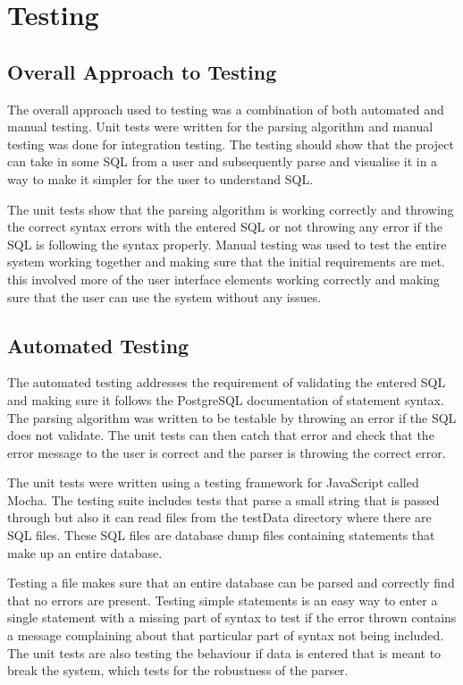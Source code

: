 \chapter{Testing}

\section{Overall Approach to Testing}

The overall approach used to testing was a combination of both automated and manual testing. Unit tests were written for the parsing algorithm and manual testing was done for integration testing. The testing should show that the project can take in some SQL from a user and subsequently parse and visualise it in a way to make it simpler for the user to understand SQL. 

The unit tests show that the parsing algorithm is working correctly and throwing the correct syntax errors with the entered SQL or not throwing any error if the SQL is following the syntax properly. Manual testing was used to test the entire system working together and making sure that the initial requirements are met. this involved more of the user interface elements working correctly and making sure that the user can use the system without any issues.

\section{Automated Testing}

The automated testing addresses the requirement of validating the entered SQL and making sure it follows the PostgreSQL documentation of statement syntax. The parsing algorithm was written to be testable by throwing an error if the SQL does not validate. The unit tests can then catch that error and check that the error message to the user is correct and the parser is throwing the correct error. 

The unit tests were written using a testing framework for JavaScript called Mocha\cite{mocha}. The testing suite includes tests that parse a small string that is passed through but also it can read files from the testData directory where there are SQL files. These SQL files are database dump files containing statements that make up an entire database. 

Testing a file makes sure that an entire database can be parsed and correctly find that no errors are present. Testing simple statements is an easy way to enter a single statement with a missing part of syntax to test if the error thrown contains a message complaining about that particular part of syntax not being included. The unit tests are also testing the behaviour if data is entered that is meant to break the system, which tests for the robustness of the parser.

